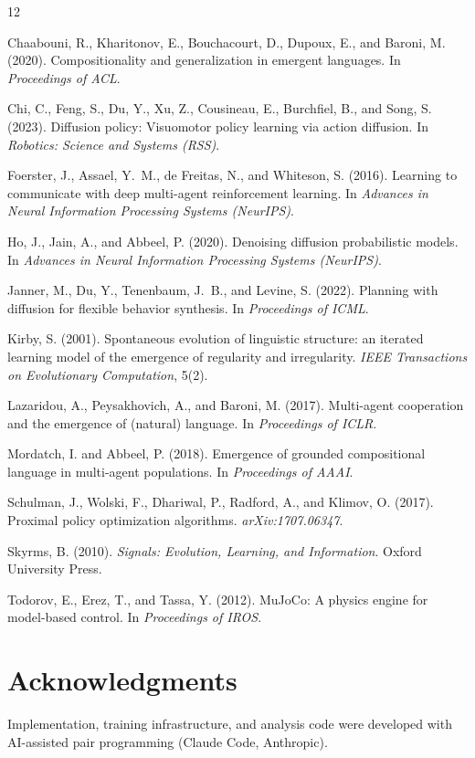 \documentclass[11pt]{article}
\begin{document}
\begin{thebibliography}{12}

Chaabouni, R., Kharitonov, E., Bouchacourt, D., Dupoux, E., and Baroni,
M. (2020). Compositionality and generalization in emergent languages.
In \emph{Proceedings of ACL}.

Chi, C., Feng, S., Du, Y., Xu, Z., Cousineau, E., Burchfiel, B., and
Song, S. (2023). Diffusion policy: Visuomotor policy learning via
action diffusion. In \emph{Robotics: Science and Systems (RSS)}.

Foerster, J., Assael, Y.~M., de Freitas, N., and Whiteson, S. (2016).
Learning to communicate with deep multi-agent reinforcement learning.
In \emph{Advances in Neural Information Processing Systems (NeurIPS)}.

Ho, J., Jain, A., and Abbeel, P. (2020). Denoising diffusion
probabilistic models. In \emph{Advances in Neural Information
Processing Systems (NeurIPS)}.

Janner, M., Du, Y., Tenenbaum, J.~B., and Levine, S. (2022). Planning
with diffusion for flexible behavior synthesis. In \emph{Proceedings of
ICML}.

Kirby, S. (2001). Spontaneous evolution of linguistic structure: an
iterated learning model of the emergence of regularity and
irregularity. \emph{IEEE Transactions on Evolutionary Computation},
5(2).

Lazaridou, A., Peysakhovich, A., and Baroni, M. (2017). Multi-agent
cooperation and the emergence of (natural) language. In
\emph{Proceedings of ICLR}.

Mordatch, I. and Abbeel, P. (2018). Emergence of grounded compositional
language in multi-agent populations. In \emph{Proceedings of AAAI}.

Schulman, J., Wolski, F., Dhariwal, P., Radford, A., and Klimov, O.
(2017). Proximal policy optimization algorithms.
\emph{arXiv:1707.06347}.

Skyrms, B. (2010). \emph{Signals: Evolution, Learning, and
Information}. Oxford University Press.

Todorov, E., Erez, T., and Tassa, Y. (2012). MuJoCo: A physics engine
for model-based control. In \emph{Proceedings of IROS}.

\end{thebibliography}

\section*{Acknowledgments}

Implementation, training infrastructure, and analysis code were
developed with AI-assisted pair programming (Claude Code, Anthropic).
\end{document}
